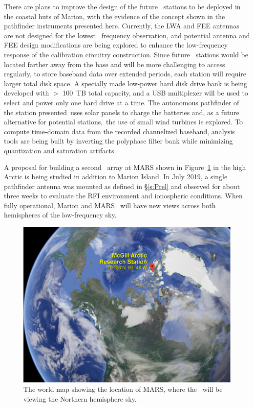 There are plans to improve the design of the future \albatros\ stations to be deployed in the coastal huts of Marion, with the evidence of the concept shown in the pathfinder instruments presented here. Currently, the LWA and FEE antennas are not designed for the lowest \albatros\ frequency observation, and potential antenna and FEE design modifications are being explored to enhance the low-frequency response of the calibration circuitry construction. Since future \albatros\ stations would be located farther away from the base and will be more challenging to access regularly, to store baseband data over extended periods, each station will require larger total disk space. A specially made low-power hard disk drive bank is being developed with $>$ 100~TB total capacity, and a USB multiplexer will be used to select and power only one hard drive at a time. The autonomous pathfinder of the station presented uses solar panels to charge the batteries and, as a future alternative for potential stations, the use of small wind turbines is explored. To compute time-domain data from the recorded channelized baseband, analysis tools are being built by inverting the polyphase filter bank while minimizing quantization and saturation artifacts.

A proposal for building a second \albatros\ array at MARS shown in Figure~\ref{Fig:MARS} in the high Arctic is being studied in addition to Marion Island. In July 2019, a single pathfinder antenna was mounted as defined in \S\ref{s:Prel} and observed for about three weeks to evaluate the RFI environment and ionospheric conditions. When fully operational, Marion and MARS \albatros\ will have new views across both hemispheres of the low-frequency sky.

\begin{figure}
	\centering
	\includegraphics[width=\linewidth]{Figures/MARS}
	\caption{The world map showing the location of MARS, where the \albatros\ will be viewing the Northern hemisphere sky.}
	\label{Fig:MARS}
\end{figure}

